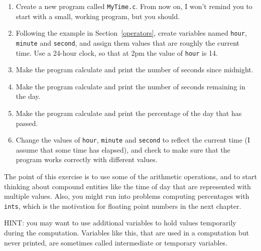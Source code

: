 \begin{exercise}

\begin{enumerate}

\item Create a new program called {\tt MyTime.c}.  From now
on, I won't remind you to start with a small, working program,
but you should.

\item Following the example in Section~\ref{operators}, create variables
named {\tt hour}, {\tt minute} and {\tt second}, and assign
them values that are roughly the current time.  Use a 24-hour
clock, so that at 2pm the value of {\tt hour} is 14.

\item Make the program calculate and print the number of
seconds since midnight.

\item Make the program calculate and print the number of
seconds remaining in the day.

\item Make the program calculate and print the percentage of
the day that has passed.

\item Change the values of {\tt hour}, {\tt minute} and {\tt second}
to reflect the current time (I assume that some time has elapsed), and
check to make sure that the program works correctly with different
values.

\end{enumerate}

The point of this exercise is to use some of the arithmetic
operations, and to start thinking about compound entities like the
time of day that are represented with multiple values.  Also,
you might run into problems computing percentages with {\tt ints},
which is the motivation for floating point numbers in the next
chapter.

HINT: you may want to use additional variables to hold values
temporarily during the computation.  Variables like this, that
are used in a computation but never printed, are sometimes called
intermediate or temporary variables.

\end{exercise}

